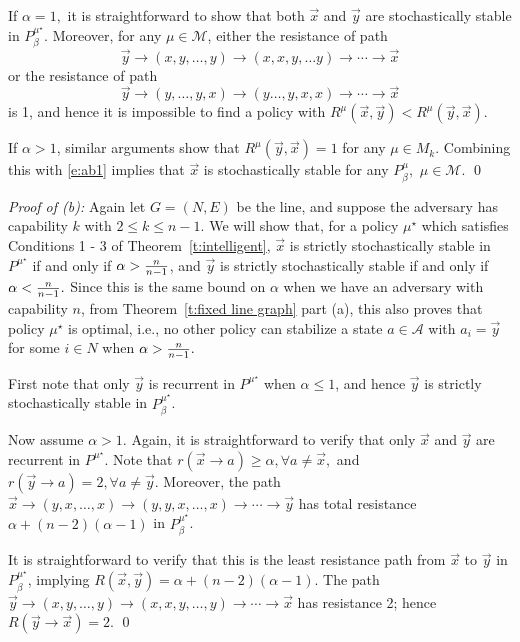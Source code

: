 If $\alpha = 1,$ it is straightforward to show that both $\vec{x}$ and $ \vec{y}$ are stochastically stable in $P^{\mu^\star}_\beta$. Moreover, for any $\mu\in\mathcal{M}$, either the resistance of path 
$$ \vec{y}\to (x,y,\ldots,y)\to (x,x,y,\ldots y)\to\cdots\to \vec{x}$$
or the resistance of path 
$$ \vec{y}\to (y,\ldots,y,x)\to (y\ldots,y,x,x)\to\cdots\to \vec{x}$$
is 1, and hence it is impossible to find a policy with $R^\mu(\vec{x}, \vec{y}) < R^\mu( \vec{y},\vec{x}).$

If $\alpha >1$, similar arguments show that $R^\mu( \vec{y},\vec{x}) = 1$ for any $\mu\in M_k.$ Combining this with \eqref{e:ab1} implies that $\vec{x}$ is stochastically stable for any $P^\mu_\beta,$ $\mu\in\mathcal{M}$.
\hfill\qed

\noindent\emph{Proof of (b):}
Again let $G = (N,E)$ be the line, and suppose the adversary has capability $k$ with $2\leq k\leq n-1.$ We will show that, for a policy $\mu^\star$ which satisfies Conditions 1 - 3 of Theorem~\ref{t:intelligent}, $\vec{x}$ is strictly stochastically stable in $P^{\mu^\star}$ if and only if $\alpha > {n\over n-1}$, and $ \vec{y}$ is strictly stochastically stable if and only if $\alpha < {n\over n-1}.$ Since this is the same bound on $\alpha$ when we have an adversary with capability $n$, from Theorem~\ref{t:fixed line graph} part (a), this also proves that policy $\mu^\star$ is optimal, i.e., no other policy can stabilize a state $a\in \mathcal{A}$ with $a_i =  \vec{y}$ for some $i\in N$ when $\alpha > {n\over n-1}.$

First note that only $ \vec{y}$ is recurrent in $P^{\mu^\star}$ when $\alpha \leq 1$, and hence $ \vec{y}$ is strictly stochastically stable in $P^{\mu^\star}_\beta$.

Now assume $\alpha > 1.$ Again, it is straightforward to verify that only $\vec{x}$ and $ \vec{y}$ are recurrent in $P^{\mu^\star}$. Note that
$r(\vec{x}\to a) \geq \alpha, \forall a\neq \vec{x},$  and $ r( \vec{y}\to a) =2, \forall a\neq  \vec{y}.$
Moreover, the path 
$\vec{x}\to(y,x,\ldots,x)\to (y,y,x,\ldots,x)\to\cdots\to  \vec{y}$
has total resistance $\alpha+(n-2)(\alpha-1)$ in $P^{\mu^\star}_\beta$. 

It is straightforward to verify that this is the least resistance path from $\vec{x}$ to $ \vec{y}$ in $P^{\mu^\star}_{\beta}$, implying 
$R(\vec{x}, \vec{y})= \alpha+(n-2)(\alpha-1).$
The path
$ \vec{y}\to(x,y,\ldots,y)\to (x,x,y,\ldots,y)\to\cdots\to \vec{x}$
has resistance 2; hence
$R( \vec{y}\to \vec{x}) = 2.$
\hfill\qed





